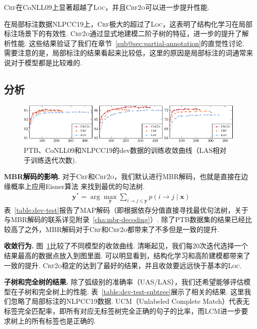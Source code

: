 \textsc{Crf}在CoNLL09上显著超越了\textsc{Loc}，并且\textsc{Crf2o}可以进一步提升性能.

在局部标注数据NLPCC19上，\textsc{Crf}极大的超过了\textsc{Loc}，这表明了结构化学习在局部标注场景下的有效性.
\textsc{Crf2o}通过显式地建模二阶子树的特征，进一步的提升了解析性能.
这些结果验证了我们在章节~\ref{sub@sec:partial-annotation}的直觉性讨论.
需要注意的是，局部标注的结果看起来比较低，这里的原因是局部标注的词通常来说对于模型都是比较难的.

\subsection{分析}
\label{sub@sec:dep-analysis}

\begin{figure}[tb!]
  \centering
  \includegraphics[width=\textwidth]{figures/convergency.pdf}
  \caption{
    PTB、CoNLL09和NLPCC19的dev数据的训练收敛曲线（LAS相对于训练迭代次数).}
  \label{fig:convergency}
\end{figure}

\noindent\textbf{MBR解码的影响.}
对于\textsc{Crf}和\textsc{Crf2o}，我们默认进行MBR解码，也就是直接在边缘概率上应用Eisner算法 \citep{smith-smith-2007-probabilistic}来找到最优的句法树.
\begin{equation}
  \begin{split}
    & {\boldsymbol{y}}^* = \arg\max_{\boldsymbol{y}} \sum_{i \rightarrow j \in \boldsymbol{y}}{p(i \rightarrow j\mid\boldsymbol{x})}
  \end{split}
\end{equation}
表~\ref{table:dev-test}报告了MAP解码（即根据依存分值直接寻找最优句法树，关于与MBR解码的联系详见附录~\ref{cha:mbr-decoding}）.
除了PTB数据集的结果已经比较高了之外，MBR解码对于\textsc{Crf}和\textsc{Crf2o}都带来了不多但是一致的提升.

\noindent\textbf{收敛行为.}
图~\ref{fig:convergency}比较了不同模型的收敛曲线.
清晰起见，我们每20次迭代选择一个结果最高的数据点放入到图里面.
可以明显看到，结构化学习和高阶建模都带来了一致的提升.
\textsc{Crf2o}稳定的达到了最好的结果，并且收敛要远远快于基本的\textsc{Loc}.



\noindent\textbf{子树和完全树的结果.}
除了弧级别的准确率（UAS/LAS），我们还希望能够评估模型在子树和完全树上的性能.
表~\ref{table:dev-test-subtree}展示了相关的结果.
这里我们忽略了局部标注的NLPCC19数据.
UCM（Unlabeled Complete Match）代表无标签完全匹配率，即所有对应无标签树完全正确的句子的比率，而LCM进一步要求树上的所有标签也是正确的.

